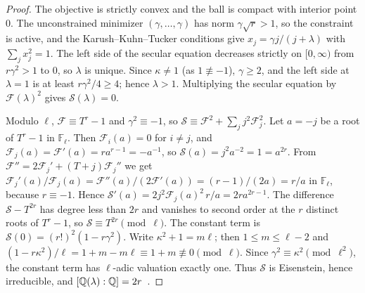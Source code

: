 \begin{proof}
The objective is strictly convex and the ball is compact with interior point
$0$. The unconstrained minimizer $(\gamma,\ldots,\gamma)$ has norm
$\gamma\sqrt r>1$, so the constraint is active, and the
Karush--Kuhn--Tucker conditions give $x_j=\gamma j/(j+\lambda)$ with
$\sum_jx_j^2=1$. The left side of the secular equation decreases strictly on
$[0,\infty)$ from $r\gamma^2>1$ to $0$, so $\lambda$ is unique. Since
$\kappa\ne1$ (as $1\not\equiv-1$), $\gamma\ge2$, and the left side at
$\lambda=1$ is at least $r\gamma^2/4\ge4$; hence $\lambda>1$. Multiplying the
secular equation by $\mathcal F(\lambda)^2$ gives $\mathcal S(\lambda)=0$.

Modulo $\ell$, $\mathcal F\equiv T^r-1$ and $\gamma^2\equiv-1$, so
$\mathcal S\equiv\mathcal F^2+\sum_jj^2\mathcal F_j^2$. Let $a=-j$ be a root of
$T^r-1$ in $\mathbb F_\ell$. Then $\mathcal F_i(a)=0$ for $i\ne j$, and
$\mathcal F_j(a)=\mathcal F'(a)=ra^{r-1}=-a^{-1}$, so $\mathcal S(a)=
j^2a^{-2}=1=a^{2r}$. From $\mathcal F''=2\mathcal F_j'+(T+j)\mathcal F_j''$ we
get $\mathcal F_j'(a)/\mathcal F_j(a)=\mathcal F''(a)/(2\mathcal F'(a))=
(r-1)/(2a)=r/a$ in $\mathbb F_\ell$, because $r\equiv-1$. Hence
$\mathcal S'(a)=2j^2\mathcal F_j(a)^2\,r/a=2ra^{2r-1}$. The difference
$\mathcal S-T^{2r}$ has degree less than $2r$ and vanishes to second order at
the $r$ distinct roots of $T^r-1$, so $\mathcal S\equiv T^{2r}\pmod\ell$. The
constant term is $\mathcal S(0)=(r!)^2(1-r\gamma^2)$. Write $\kappa^2+1=m\ell$;
then $1\le m\le\ell-2$ and
$(1-r\kappa^2)/\ell=1+m-m\ell\equiv1+m\not\equiv0\pmod\ell$. Since
$\gamma^2\equiv\kappa^2\pmod{\ell^2}$, the constant term has $\ell$-adic
valuation exactly one. Thus $\mathcal S$ is Eisenstein, hence irreducible,
and $[\mathbb Q(\lambda):\mathbb Q]=2r$~\cite{Neukirch1999}.


\end{proof}
